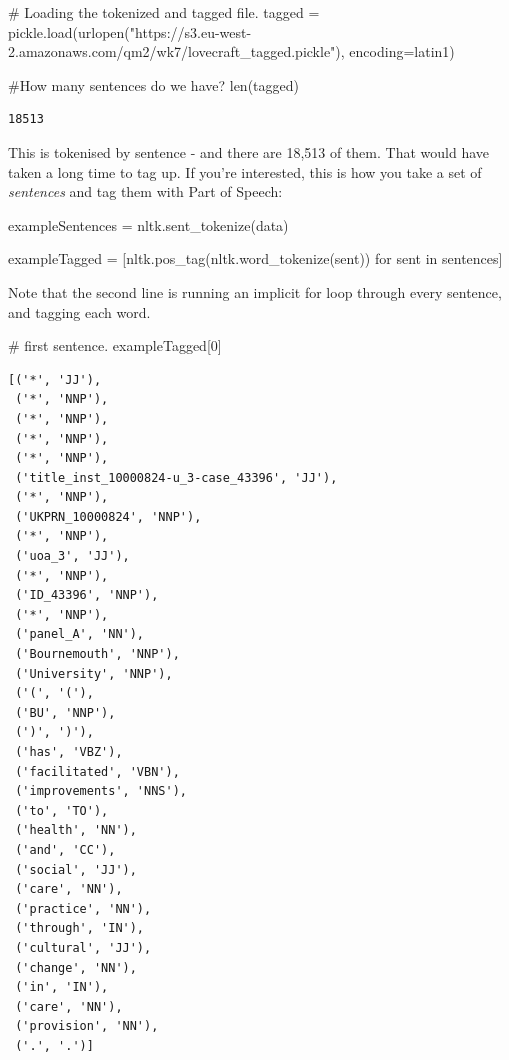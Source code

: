 \documentclass[
  letterpaper,
  DIV=11,
  numbers=noendperiod]{scrreprt}
\newenvironment{Shaded}{\begin{snugshade}}{\end{snugshade}}
\newcommand{\BuiltInTok}[1]{\textcolor[rgb]{0.00,0.23,0.31}{#1}}
\newcommand{\CommentTok}[1]{\textcolor[rgb]{0.37,0.37,0.37}{#1}}
\newcommand{\ControlFlowTok}[1]{\textcolor[rgb]{0.00,0.23,0.31}{#1}}
\newcommand{\DecValTok}[1]{\textcolor[rgb]{0.68,0.00,0.00}{#1}}
\newcommand{\KeywordTok}[1]{\textcolor[rgb]{0.00,0.23,0.31}{#1}}
\newcommand{\NormalTok}[1]{\textcolor[rgb]{0.00,0.23,0.31}{#1}}
\newcommand{\OperatorTok}[1]{\textcolor[rgb]{0.37,0.37,0.37}{#1}}
\newcommand{\StringTok}[1]{\textcolor[rgb]{0.13,0.47,0.30}{#1}}
\begin{document}
\begin{Shaded}
\begin{Highlighting}[]
\CommentTok{\# Loading the tokenized and tagged file. }
\NormalTok{tagged }\OperatorTok{=}\NormalTok{ pickle.load(urlopen(}\StringTok{"https://s3.eu{-}west{-}2.amazonaws.com/qm2/wk7/lovecraft\_tagged.pickle"}\NormalTok{), encoding}\OperatorTok{=}\StringTok{\textquotesingle{}latin1\textquotesingle{}}\NormalTok{)}

\CommentTok{\#How many sentences do we have?}
\BuiltInTok{len}\NormalTok{(tagged)}
\end{Highlighting}
\end{Shaded}

\begin{verbatim}
18513
\end{verbatim}

This is tokenised by sentence - and there are 18,513 of them. That would
have taken a long time to tag up. If you're interested, this is how you
take a set of \emph{sentences} and tag them with Part of Speech:

\begin{Shaded}
\begin{Highlighting}[]
\NormalTok{exampleSentences }\OperatorTok{=}\NormalTok{ nltk.sent\_tokenize(data)}
  
\NormalTok{exampleTagged }\OperatorTok{=}\NormalTok{ [nltk.pos\_tag(nltk.word\_tokenize(sent)) }\ControlFlowTok{for}\NormalTok{ sent }\KeywordTok{in}\NormalTok{ sentences]}
\end{Highlighting}
\end{Shaded}

Note that the second line is running an implicit for loop through every
sentence, and tagging each word.

\begin{Shaded}
\begin{Highlighting}[]
\CommentTok{\# first sentence.}
\NormalTok{exampleTagged[}\DecValTok{0}\NormalTok{]}
\end{Highlighting}
\end{Shaded}

\begin{verbatim}
[('*', 'JJ'),
 ('*', 'NNP'),
 ('*', 'NNP'),
 ('*', 'NNP'),
 ('*', 'NNP'),
 ('title_inst_10000824-u_3-case_43396', 'JJ'),
 ('*', 'NNP'),
 ('UKPRN_10000824', 'NNP'),
 ('*', 'NNP'),
 ('uoa_3', 'JJ'),
 ('*', 'NNP'),
 ('ID_43396', 'NNP'),
 ('*', 'NNP'),
 ('panel_A', 'NN'),
 ('Bournemouth', 'NNP'),
 ('University', 'NNP'),
 ('(', '('),
 ('BU', 'NNP'),
 (')', ')'),
 ('has', 'VBZ'),
 ('facilitated', 'VBN'),
 ('improvements', 'NNS'),
 ('to', 'TO'),
 ('health', 'NN'),
 ('and', 'CC'),
 ('social', 'JJ'),
 ('care', 'NN'),
 ('practice', 'NN'),
 ('through', 'IN'),
 ('cultural', 'JJ'),
 ('change', 'NN'),
 ('in', 'IN'),
 ('care', 'NN'),
 ('provision', 'NN'),
 ('.', '.')]
\end{verbatim}
\end{document}
